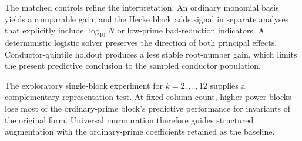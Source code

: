 \documentclass[12pt,reqno]{amsart}
\numberwithin{equation}{section}
\theoremstyle{plain}
\theoremstyle{definition}
\theoremstyle{remark}
\begin{document}
The matched controls refine the interpretation.
An ordinary monomial basis yields a comparable gain, and the Hecke block adds signal in separate analyses that explicitly include $\log_{10}N$ or low-prime bad-reduction indicators.
A deterministic logistic solver preserves the direction of both principal effects.
Conductor-quintile holdout produces a less stable root-number gain, which limits the present predictive conclusion to the sampled conductor population.

The exploratory single-block experiment for $k=2,\ldots,12$ supplies a complementary representation test.
At fixed column count, higher-power blocks lose most of the ordinary-prime block's predictive performance for invariants of the original form.
Universal murmuration therefore guides structured augmentation with the ordinary-prime coefficients retained as the baseline.
\end{document}
